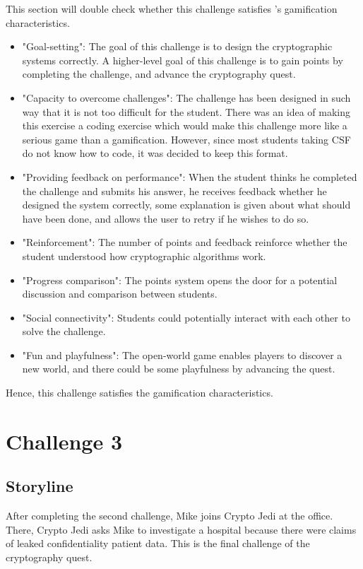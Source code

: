 \documentclass{l4proj}
\begin{document}
This section will double check whether this challenge satisfies \citet{cugelman_gamification:_2013}'s
gamification characteristics.
\begin{itemize}
    \item "Goal-setting": The goal of this challenge is to design the cryptographic systems correctly. 
    A higher-level goal of this challenge is to gain points by completing the challenge, 
    and advance the cryptography quest.
    \item "Capacity to overcome challenges": The challenge has been designed in such way 
    that it is not too difficult for the student. There was an idea of making this exercise a coding exercise
    which would make this challenge more like a serious game than a gamification. 
    However, since most students taking CSF do not know how to code, it was decided to keep this format.
    \item "Providing feedback on performance": When the student thinks he completed the challenge and submits his answer,
    he receives feedback whether he designed the system correctly, some explanation is given about what should have been done,
    and allows the user to retry if he wishes to do so.
    \item "Reinforcement": The number of points and feedback reinforce whether the student understood how cryptographic algorithms work.
    \item "Progress comparison": The points system opens the door for a potential discussion and comparison between students.
    \item "Social connectivity": Students could potentially interact with each other to solve the challenge.
    \item "Fun and playfulness": The open-world game enables players to discover a new world, 
    and there could be some playfulness by advancing the quest.
\end{itemize}
Hence, this challenge satisfies the gamification characteristics.

\section{Challenge 3}

\subsection{Storyline}

After completing the second challenge, Mike joins Crypto Jedi at the office. 
There, Crypto Jedi asks Mike to investigate a hospital because there were claims of leaked confidentiality
patient data. This is the final challenge of the cryptography quest.
\end{document}
